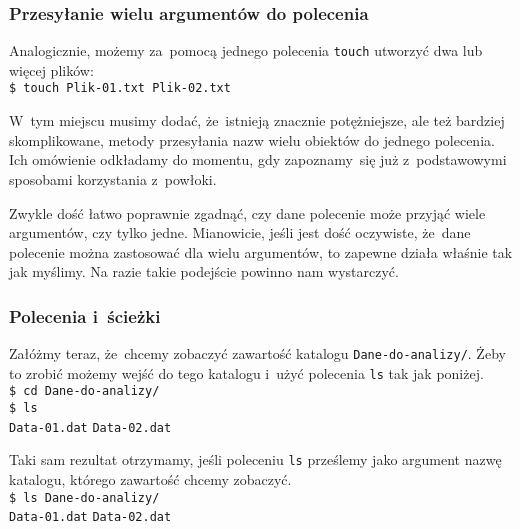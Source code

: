 \documentclass[10pt,t]{beamer}
\begin{document}
\begin{frame}
  \frametitle{Przesyłanie wielu argumentów do polecenia}


  Analogicznie, możemy za~pomocą jednego polecenia \texttt{touch} utworzyć
  dwa lub więcej plików: \\
  \texttt{\$ touch Plik-01.txt Plik-02.txt}

  W~tym miejscu musimy dodać, że~istnieją znacznie potężniejsze, ale też
  bardziej skomplikowane, metody przesyłania nazw wielu obiektów do jednego
  polecenia. Ich omówienie odkładamy do momentu, gdy zapoznamy~się już
  z~podstawowymi sposobami korzystania z~powłoki.

  Zwykle dość łatwo poprawnie zgadnąć, czy dane polecenie może przyjąć
  wiele argumentów, czy tylko jedne. Mianowicie, jeśli jest dość oczywiste,
  że~dane polecenie można zastosować dla wielu argumentów, to zapewne
  działa właśnie tak jak myślimy. Na razie takie podejście powinno nam
  wystarczyć.

\end{frame}





\begin{frame}
  \frametitle{Polecenia i~ścieżki}


  Załóżmy teraz, że~chcemy zobaczyć zawartość katalogu
  \texttt{Dane-do-analizy/}. Żeby to zrobić możemy wejść do tego katalogu
  i~użyć polecenia \texttt{ls} tak jak poniżej. \\
  \texttt{\$ cd Dane-do-analizy/} \\
  \texttt{\$ ls} \\
  \texttt{Data-01.dat} \quad \texttt{Data-02.dat}

  Taki sam rezultat otrzymamy, jeśli poleceniu \texttt{ls} prześlemy jako
  argument nazwę katalogu, którego zawartość chcemy zobaczyć. \\
  \texttt{\$ ls Dane-do-analizy/} \\
  \texttt{Data-01.dat} \quad \texttt{Data-02.dat}

\end{frame}
\end{document}
